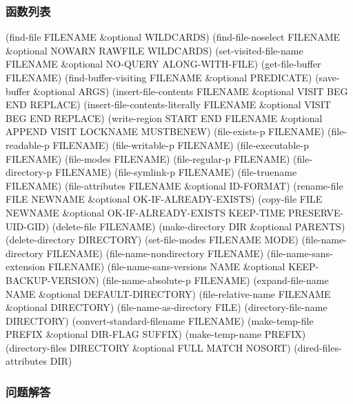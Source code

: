 \documentclass[11pt]{ctexart}
\begin{document}
{{{{\subsubsection{函数列表}
\label{sec:org481c66f}
(find-file FILENAME \&optional WILDCARDS)
(find-file-noselect FILENAME \&optional NOWARN RAWFILE WILDCARDS)
(set-visited-file-name FILENAME \&optional NO-QUERY ALONG-WITH-FILE)
(get-file-buffer FILENAME)
(find-buffer-visiting FILENAME \&optional PREDICATE)
(save-buffer \&optional ARGS)
(insert-file-contents FILENAME \&optional VISIT BEG END REPLACE)
(insert-file-contents-literally FILENAME \&optional VISIT BEG END REPLACE)
(write-region START END FILENAME \&optional APPEND VISIT LOCKNAME MUSTBENEW)
(file-exists-p FILENAME)
(file-readable-p FILENAME)
(file-writable-p FILENAME)
(file-executable-p FILENAME)
(file-modes FILENAME)
(file-regular-p FILENAME)
(file-directory-p FILENAME)
(file-symlink-p FILENAME)
(file-truename FILENAME)
(file-attributes FILENAME \&optional ID-FORMAT)
(rename-file FILE NEWNAME \&optional OK-IF-ALREADY-EXISTS)
(copy-file FILE NEWNAME \&optional OK-IF-ALREADY-EXISTS KEEP-TIME PRESERVE-UID-GID)
(delete-file FILENAME)
(make-directory DIR \&optional PARENTS)
(delete-directory DIRECTORY)
(set-file-modes FILENAME MODE)
(file-name-directory FILENAME)
(file-name-nondirectory FILENAME)
(file-name-sans-extension FILENAME)
(file-name-sans-versions NAME \&optional KEEP-BACKUP-VERSION)
(file-name-absolute-p FILENAME)
(expand-file-name NAME \&optional DEFAULT-DIRECTORY)
(file-relative-name FILENAME \&optional DIRECTORY)
(file-name-as-directory FILE)
(directory-file-name DIRECTORY)
(convert-standard-filename FILENAME)
(make-temp-file PREFIX \&optional DIR-FLAG SUFFIX)
(make-temp-name PREFIX)
(directory-files DIRECTORY \&optional FULL MATCH NOSORT)
(dired-files-attributes DIR)
\subsubsection{问题解答}
\label{sec:orgac86497}
}}}}
\end{document}
